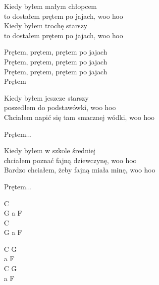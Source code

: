 \begin{text} 
    Kiedy byłem małym chłopcem\\
    to dostałem prętem po jajach, woo hoo\\
    Kiedy byłem trochę starszy\\
    to dostałem prętem po jajach, woo hoo

    \vin Prętem, prętem, prętem po jajach\\
    \vin Prętem, prętem, prętem po jajach\\
    \vin Prętem, prętem, prętem po jajach\\
    \vin Prętem

    Kiedy byłem jeszcze starszy\\
    poszedłem do podstawówki, woo hoo\\
    Chciałem napić się tam smacznej wódki, woo hoo

    \vin Prętem...

    Kiedy byłem w szkole średniej\\
    chciałem poznać fajną dziewczynę, woo hoo\\
    Bardzo chciałem, żeby fajną miała minę, woo hoo

    \vin Prętem...
\end{text}
\begin{chord}
    C\\
    G a F \\
    C\\
    G a F 

    C G\\ 
    a F\\
    C G \\
    a F
\end{chord}